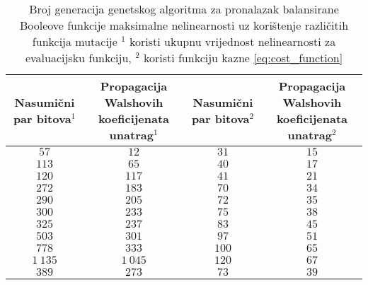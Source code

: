 \begin{table}[]
    \centering
    \captionsetup{justification=centering}
    \caption{Broj generacija genetskog algoritma za pronalazak balansirane Booleove funkcije maksimalne nelinearnosti uz korištenje različitih funkcija mutacije \newline
    \footnotesize{$^1$ koristi ukupnu vrijednost nelinearnosti za evaluacijsku funkciju, $^2$ koristi funkciju kazne \eqref{eq:cost_function}} }
    \begin{tabular}{cccc} \hline
        \makecell{Nasumični \\ par bitova$^1$} & \makecell{Propagacija Walshovih \\ koeficijenata unatrag$^1$} & \makecell{Nasumični \\ par bitova$^2$} & \makecell{Propagacija Walshovih \\ koeficijenata unatrag$^2$} \\ \hline
            $57$ &     $12$ &  $31$ & $15$ \\
           $113$ &     $65$ &  $40$ & $17$ \\
           $120$ &    $117$ &  $41$ & $21$ \\
           $272$ &    $183$ &  $70$ & $34$ \\
           $290$ &    $205$ &  $72$ & $35$ \\
           $300$ &    $233$ &  $75$ & $38$ \\
           $325$ &    $237$ &  $83$ & $45$ \\
           $503$ &    $301$ &  $97$ & $51$ \\
           $778$ &    $333$ & $100$ & $65$ \\
        $1\:135$ & $1\:045$ & $120$ & $67$ \\ \hline
           $389$ &    $273$ &  $73$ & $39$
    \end{tabular}
    \label{tbl:ga_6_bal}
\end{table}

